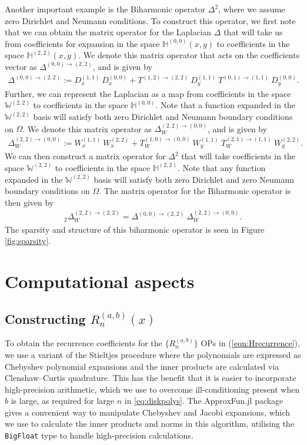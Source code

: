 \documentclass[11pt, oneside]{article}   	%
\newcommand{\hdop}{H}
\newcommand{\bighdop}{\mathbb{\hdop}}
\newcommand{\bighdopoo}{{\mathbb{\hdop}^{(0,0)}}}
\newcommand{\genjac}{R}
\newcommand{\laplacewtt}{\Delta_W^{(2,2)\to(0,0)}}
\newcommand{\laplaceoo}{\Delta^{(0,0)\to(2,2)}}
\newcommand{\biharmonic}{_2\Delta_W^{(2,2)\to(2,2)}}
\newcommand{\bigW}{\mathbb{W}}
\begin{document}
Another important example is the Biharmonic operator $\Delta^2$, where we assume zero Dirichlet and Neumann conditions. To construct this operator, we first note that we can obtain the matrix operator for the Laplacian $\Delta$ that will take us from coefficients for expansion in the space $\bighdopoo(x,y)$ to coefficients in the space $\bighdop^{(2,2)}(x,y)$. We denote this matrix operator that acts on the coefficients vector as $\laplaceoo$, and is given by
\begin{align*}
    \laplaceoo := D_x^{(1,1)} \: D_x^{(0,0)} + T^{(1,2)\to(2,2)} \: D_y^{(1,1)} \: T^{(0,1)\to(1,1)} \: D_y^{(0,0)}.
\end{align*}
Further, we can represent the Laplacian as a map from coefficients in the space $\bigW^{(2,2)}$ to coefficients in the space $\bighdopoo$. Note that a function expanded in the $\bigW^{(2,2)}$ basis will satisfy both zero Dirichlet and Neumann boundary conditions on $\Omega$. We denote this matrix operator as $\laplacewtt$, and is given by
\begin{align*}
	\laplacewtt := W_x^{(1,1)} \: W_x^{(2,2)} + T_W^{(1,0)\to(0,0)} \: W_y^{(1,1)} \: T_W^{(2,1)\to(1,1)} \: W_y^{(2,2)}.
\end{align*}
We can then construct a matrix operator for $\Delta^2$ that will take coefficients in the space $\bigW^{(2,2)}$ to coefficients in the space $\bighdop^{(2,2)}$. Note that any function expanded in the $\bigW^{(2,2)}$ basis will satisfy both zero Dirichlet and zero Neumann boundary conditions on $\Omega$. The matrix operator for the Biharmonic operator is then given by
\begin{align*}
	\biharmonic = \laplaceoo \: \laplacewtt.
\end{align*}
The sparsity and structure of this biharmonic operator is seen in Figure \ref{fig:sparsity}.



\section{Computational aspects}\label{Section:Computation}

\subsection{Constructing $\genjac_n^{(a,b)}(x)$}

To obtain the recurrence coefficients for the $\{\genjac_n^{(a,b)}\}$ OPs in (\ref{eqn:Hrecurrence}), we use a variant of the Stieltjes procedure \cite{gautschi1982generating} where the polynomials are expressed as Chebyshev polynomial expansions and the inner products are calculated via Clenshaw--Curtis quadrature. This has the benefit that it is easier to incorporate high-precision arithmetic, which we use to overcome ill-conditioning present when $b$ is large, as required for large $n$ in \eqref{eq:diskpolys}. The ApproxFun.jl \cite{ApproxFun} package gives a convenient way to manipulate Chebyshev and Jacobi expansions, which we use to calculate the inner products and norms in this algorithm, utilising the {\tt BigFloat} type to handle high-precision calculations.
\end{document}
